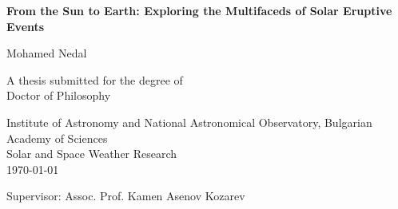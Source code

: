 \begin{titlepage}
    \begin{center}
        \vspace*{1cm}
        
        \Huge
        \textbf{From the Sun to Earth: Exploring the Multifaceds of Solar Eruptive Events}
        
        \vspace{1.5cm}
        
        \LARGE
        Mohamed Nedal
        
        \vfill
        
        A thesis submitted for the degree of\\
        Doctor of Philosophy
        
        \vspace{0.8cm}
        
        \Large
        Institute of Astronomy and National Astronomical Observatory, Bulgarian Academy of Sciences\\
        Solar and Space Weather Research\\
        \today
        
        \vspace{0.8cm}
        
        Supervisor: Assoc. Prof. Kamen Asenov Kozarev
        
    \end{center}
\end{titlepage}
